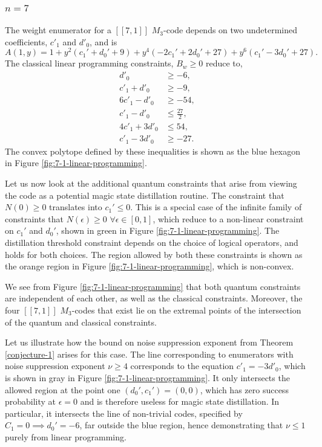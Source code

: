 \documentclass[11pt]{article}
\begin{document}
\subsubsection{$n=7$}
The weight enumerator for a $[[7,1]]$ $M_3$-code depends on two undetermined coefficients, $c'_1$ and $d'_0$, and is
\begin{equation}
    A(1, y) = 1 
            + y^2 \left( c_1' + d_0' + 9 \right) 
            + y^4 \left( -2c_1' + 2d_0' + 27 \right) 
            + y^6 \left( c_1' - 3d_0' + 27 \right).
\end{equation}
The classical linear programming constraints, $B_w \geq 0$  reduce to,
\begin{align*}
    d'_0  & \geq -6, \\
    c'_1 + d'_0 & \geq -9, \\
    6c'_1 -d'_0 & \geq -54, \\
    c'_1 -d'_0  & \leq \frac{27}{2}, \\
    4c'_1 + 3d'_0 & \leq 54, \\
    c'_1 - 3d'_0 & \geq -27 . 
\end{align*}
The convex polytope defined by these inequalities is shown as the blue hexagon in Figure \ref{fig:7-1-linear-programming}.

Let us now look at the additional quantum constraints that arise from viewing the code as a potential magic state distillation routine. The constraint that $N(0)\geq 0$ translates into $c_1'\leq 0$. This is a special case of the infinite family of constraints that $N(\epsilon) \geq 0$ $\forall\epsilon \in [0,1]$, which reduce to a non-linear constraint on $c_1'$ and $d_0'$, shown in green in Figure \ref{fig:7-1-linear-programming}. The distillation threshold constraint depends on the choice of logical operators, and holds for both choices. The region allowed by both these constraints is shown as the orange region in Figure \ref{fig:7-1-linear-programming}, which is non-convex. 

We see from Figure \ref{fig:7-1-linear-programming} that both quantum constraints are independent of each other, as well as the classical constraints. Moreover, the four $[[7,1]]$ $M_3$-codes that exist lie on the extremal points of the intersection of the quantum and classical constraints. 

Let us illustrate how the bound on noise suppression exponent from Theorem \ref{conjecture-1} arises for this case. The line corresponding to enumerators with noise suppression exponent $\nu \geq 4$ corresponds to the equation $c'_1=-3d'_0$, which is shown in gray in Figure \ref{fig:7-1-linear-programming}. It only intersects the allowed region at the point one $(d_0',c_1')=(0,0)$, which has zero success probability at $\epsilon=0$ and is therefore useless for magic state distillation. In particular, it intersects the line of non-trivial codes, specified by $C_1=0 \implies d_0'=-6$, far outside the blue region, hence demonstrating that $\nu \leq 1$ purely from linear programming.
\end{document}
